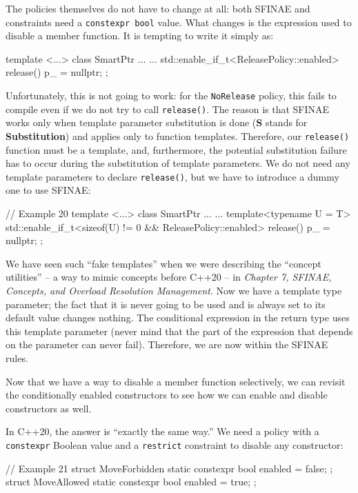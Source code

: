 The policies themselves do not have to change at all: both SFINAE and constraints need a \texttt{constexpr\ bool} value. What changes is the expression used to disable a member function. It is tempting to write it simply as:

\begin{code}
template <...> class SmartPtr ... {
  ...
  std::enable_if_t<ReleasePolicy::enabled> release() {
    p_ = nullptr;
  }
};
\end{code}

Unfortunately, this is not going to work: for the \texttt{NoRelease} policy, this fails to compile even if we do not try to call \texttt{release()}. The reason is that SFINAE works only when template parameter substitution is done (\textbf{S} stands for \textbf{Substitution}) and applies only to function templates. Therefore, our \texttt{release()} function must be a template, and, furthermore, the potential substitution failure has to occur during the substitution of template parameters. We do not need any template parameters to declare \texttt{release()}, but we have to introduce a dummy one to use SFINAE:

\begin{code}
// Example 20
template <...> class SmartPtr ... {
  ...
  template<typename U = T>
  std::enable_if_t<sizeof(U) != 0 &&
                   ReleasePolicy::enabled> release() {
    p_ = nullptr;
  }
};
\end{code}

We have seen such ``fake templates'' when we were describing the ``concept utilities'' -- a way to mimic concepts before C++20 -- in \emph{Chapter 7, SFINAE, Concepts, and Overload Resolution Management}. Now we have a template type parameter; the fact that it is never going to be used and is always set to its default value changes nothing. The conditional expression in the return type uses this template parameter (never mind that the part of the expression that depends on the parameter can never fail). Therefore, we are now within the SFINAE rules.

Now that we have a way to disable a member function selectively, we can revisit the conditionally enabled constructors to see how we can enable and disable constructors as well.

In C++20, the answer is ``exactly the same way.'' We need a policy with a \texttt{constexpr} Boolean value and a \texttt{restrict} constraint to disable any constructor:

\begin{code}
// Example 21
struct MoveForbidden {
  static constexpr bool enabled = false;
};
struct MoveAllowed {
  static constexpr bool enabled = true;
};
\end{code}

